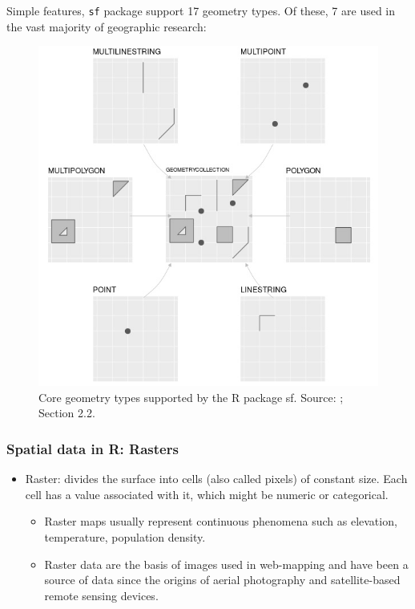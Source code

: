 \documentclass[12pt]{beamer}
\begin{document}
\begin{frame}
Simple features, \texttt{sf} package \citep{Pebesma2018} support 17 geometry types. Of these, 7 are used in the vast majority of geographic research:
\begin{figure}
\includegraphics[scale=0.55]{Figures/Features_supported_by_sf.jpg}
\caption{\footnotesize Core geometry types supported by the R package sf. Source: \citet{Lovelace2019}; Section 2.2.}
\end{figure}
\end{frame}


\begin{frame}
\frametitle{Spatial data in R: Rasters}
\begin{itemize}
  \item \vfill \alert{Raster}: divides the surface into cells (also called pixels) of constant size. Each cell has a value associated with it, which might be numeric or categorical. 
   \begin{itemize}
   \item \vfill Raster maps usually represent continuous phenomena such as elevation, temperature, population density.
   \item \vfill Raster data are the basis of images used in web-mapping and have been a source of data since the origins of aerial photography and satellite-based remote sensing devices.
\end{itemize}
\end{itemize}
\end{frame}
\end{document}
